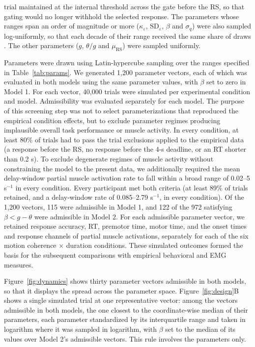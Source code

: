 \documentclass[a4paper,11pt]{article}
\theoremstyle{definition}
\newcommand{\1}{\mathbbm{1}}
\begin{document}
trial maintained at the internal threshold across the gate before the RS, so that gating would no longer withhold the selected response. The parameters whose ranges span an order of magnitude or more ($\kappa_{\varepsilon}$, $\mathrm{SD}_{\varepsilon}$, $\beta$ and $\sigma_{q}$) were also sampled log-uniformly, so that each decade of their range received the same share of draws \parencites{evansParameterRecoveryAssessment2020}{marinoMethodologyPerformingGlobal2008}. The other parameters ($g$, $\theta/g$ and $\mu_{\mathrm{RS}}$) were sampled uniformly.

Parameters were drawn using Latin-hypercube sampling over the ranges specified in Table~\ref{tab:params}. We generated 1,200 parameter vectors, each of which was evaluated in both models using the same parameter values, with $\beta$ set to zero in Model 1. For each vector, 40,000 trials were simulated per experimental condition and model. Admissibility was evaluated separately for each model. The purpose of this screening step was not to select parameterizations that reproduced the empirical condition effects, but to exclude parameter regimes producing implausible overall task performance or muscle activity. In every condition, at least 80\% of trials had to pass the trial exclusions applied to the empirical data (a response before the RS, no response before the 4-s deadline, or an RT shorter than 0.2 s). To exclude degenerate regimes of muscle activity without constraining the model to the present data, we additionally required the mean delay-window partial muscle activation rate to fall within a broad range of 0.02--5 s$^{-1}$ in every condition. Every participant met both criteria (at least 89\% of trials retained, and a delay-window rate of 0.085--2.79 s$^{-1}$, in every condition). Of the 1,200 vectors, 115 were admissible in Model 1, and 122 of the 972 satisfying $\beta<g-\theta$ were admissible in Model 2. For each admissible parameter vector, we retained response accuracy, RT, premotor time, motor time, and the onset times and response channels of partial muscle activations, separately for each of the six motion coherence $\times$ duration conditions. These simulated outcomes formed the basis for the subsequent comparisons with empirical behavioral and EMG measures.

Figure~\ref{fig:dynamics} shows thirty parameter vectors admissible in both models, so that it displays the spread across the parameter space. Figure~\ref{fig:design}B shows a single simulated trial at one representative vector: among the vectors admissible in both models, the one closest to the coordinate-wise median of their parameters, each parameter standardized by its interquartile range and taken in logarithm where it was sampled in logarithm, with $\beta$ set to the median of its values over Model 2's admissible vectors. This rule involves the parameters only.
\end{document}

